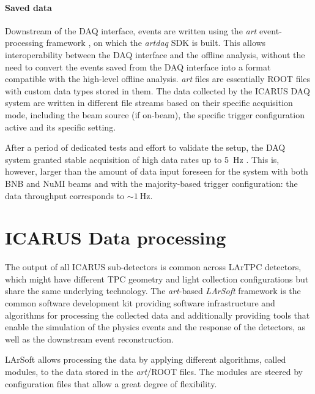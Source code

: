 \paragraph{Saved data} Downstream of the DAQ interface, events are written using the \emph{art} event-processing framework \cite{greenArtFramework2012}, on which the \emph{artdaq} SDK is built. This allows interoperability between the DAQ interface and the offline analysis, without the need to convert the events saved from the DAQ interface into a format compatible with the high-level offline analysis. \emph{art} files are essentially ROOT files \cite{rene_brun_2019_3895860} with custom data types stored in them. The data collected by the ICARUS DAQ system are written in different file streams based on their specific acquisition mode, including the beam source (if on-beam), the specific trigger configuration active and its specific setting.

After a period of dedicated tests and effort to validate the setup, the DAQ system granted stable acquisition of high data rates up to \SI{5}{\hertz} \cite{abratenkoICARUSFermilabShortBaseline2023}. This is, however, larger than the amount of data input foreseen for the system with both BNB and NuMI beams and with the majority-based trigger configuration: the data throughput corresponds to ${\sim}\SI{1}{\hertz}$.

\section{ICARUS Data processing}

The output of all ICARUS sub-detectors is common across LArTPC detectors, which might have different TPC geometry and light collection configurations but share the same underlying technology. The \emph{art}-based \emph{LArSoft} framework \cite{Church:2013hea,Snider:2017wjd,Pordes:2017BL} is the common software development kit providing software infrastructure and algorithms for processing the collected data and additionally providing tools that enable the simulation of the physics events and the response of the detectors, as well as the downstream event reconstruction. 

LArSoft allows processing the data by applying different algorithms, called modules, to the data stored in the \emph{art}/ROOT files. The modules are steered by configuration files that allow a great degree of flexibility. 


